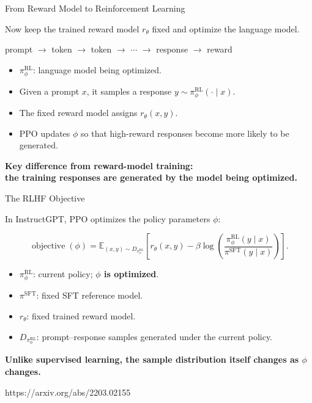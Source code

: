 \documentclass[11pt,compress,t,notes=noshow, xcolor=table]{beamer}
\begin{document}

\begin{vbframe}{From Reward Model to Reinforcement Learning}

Now keep the trained reward model $r_\theta$ fixed
and optimize the language model.

\begin{center}
prompt
$\rightarrow$
token
$\rightarrow$
token
$\rightarrow$
$\cdots$
$\rightarrow$
response
$\rightarrow$
reward
\end{center}

\begin{itemize}
    \item $\pi_\phi^{\mathrm{RL}}$: language model being optimized.
    \item Given a prompt $x$, it samples a response
          $y\sim\pi_\phi^{\mathrm{RL}}(\cdot\mid x)$.
    \item The fixed reward model assigns $r_\theta(x,y)$.
    \item PPO updates $\phi$ so that high-reward responses become
          more likely to be generated.
\end{itemize}

\begin{center}
\textbf{Key difference from reward-model training:}\\
\textbf{the training responses are generated by the model being optimized.}
\end{center}

\end{vbframe}



\begin{vbframe}{The RLHF Objective}

In InstructGPT, PPO optimizes the policy parameters $\phi$:

\[
\operatorname{objective}(\phi)
=
\mathbb{E}_{(x,y)\sim D_{\pi_\phi^{\mathrm{RL}}}}
\left[
r_\theta(x,y)
-
\beta
\log
\left(
\frac{
\pi_\phi^{\mathrm{RL}}(y\mid x)
}{
\pi^{\mathrm{SFT}}(y\mid x)
}
\right)
\right].
\]

\begin{itemize}
    \item $\pi_\phi^{\mathrm{RL}}$: current policy; \textbf{$\phi$ is optimized}.
    \item $\pi^{\mathrm{SFT}}$: fixed SFT reference model.
    \item $r_\theta$: fixed trained reward model.
    \item $D_{\pi_\phi^{\mathrm{RL}}}$: prompt--response samples generated
          under the current policy.
\end{itemize}

\begin{center}
\textbf{Unlike supervised learning, the sample distribution itself
changes as $\phi$ changes.}
\end{center}

{https://arxiv.org/abs/2203.02155}

\end{vbframe}
\end{document}
